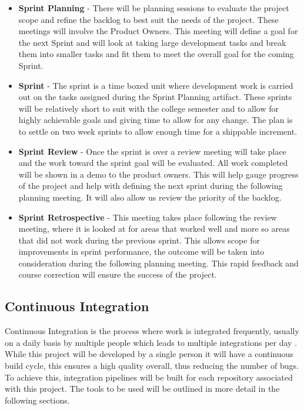 \begin{itemize}
    \item \textbf{Sprint Planning} - There will be planning sessions to evaluate the project scope and refine the backlog to best suit the needs of the project. These meetings will involve the Product Owners. This meeting will define a goal for the next Sprint and will look at taking large development tasks and break them into smaller tasks and fit them to meet the overall goal for the coming Sprint.
    \item \textbf{Sprint} - The sprint is a time boxed unit where development work is carried out on the tasks assigned during the Sprint Planning artifact. These sprints will be relatively short to suit with the college semester and to allow for highly achievable goals and giving time to allow for any change. The plan is to settle on two week sprints to allow enough time for a shippable increment.
    \item \textbf{Sprint Review} - Once the sprint is over a review meeting will take place and the work toward the sprint goal will be evaluated. All work completed will be shown in a demo to the product owners. This will help gauge progress of the project and help with defining the next sprint during the following planning meeting. It will also allow us review the priority of the backlog.
    \item \textbf{Sprint Retrospective} - This meeting takes place following the review meeting, where it is looked at for areas that worked well and more so areas that did not work during the previous sprint. This allows scope for improvements in sprint performance, the outcome will be taken into consideration during the following planning meeting. This rapid feedback and course correction will ensure the success of the project.
\end{itemize}

\subsection{Continuous Integration}
Continuous Integration is the process where work is integrated frequently, usually on a daily basis by multiple people which leads to multiple integrations per day \citep{fowler_2006}. While this project will be developed by a single person it will have a continuous build cycle, this ensures a high quality overall, thus reducing the number of bugs. To achieve this, integration pipelines will be built for each repository associated with this project. The tools to be used will be outlined in more detail in the following sections. 

